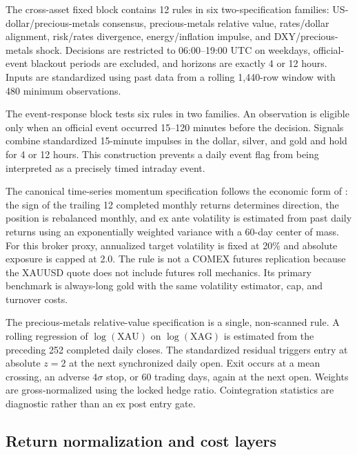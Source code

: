 The cross-asset fixed block contains 12 rules in six two-specification families: US-dollar/precious-metals consensus, precious-metals relative value, rates/dollar alignment, risk/rates divergence, energy/inflation impulse, and DXY/precious-metals shock. Decisions are restricted to 06:00--19:00 UTC on weekdays, official-event blackout periods are excluded, and horizons are exactly 4 or 12 hours. Inputs are standardized using past data from a rolling 1,440-row window with 480 minimum observations.

The event-response block tests six rules in two families. An observation is eligible only when an official event occurred 15--120 minutes before the decision. Signals combine standardized 15-minute impulses in the dollar, silver, and gold and hold for 4 or 12 hours. This construction prevents a daily event flag from being interpreted as a precisely timed intraday event.

The canonical time-series momentum specification follows the economic form of \citet{moskowitz2012}: the sign of the trailing 12 completed monthly returns determines direction, the position is rebalanced monthly, and ex ante volatility is estimated from past daily returns using an exponentially weighted variance with a 60-day center of mass. For this broker proxy, annualized target volatility is fixed at 20\% and absolute exposure is capped at 2.0. The rule is not a COMEX futures replication because the XAUUSD quote does not include futures roll mechanics. Its primary benchmark is always-long gold with the same volatility estimator, cap, and turnover costs.

The precious-metals relative-value specification is a single, non-scanned rule. A rolling regression of $\log(\mathrm{XAU})$ on $\log(\mathrm{XAG})$ is estimated from the preceding 252 completed daily closes. The standardized residual triggers entry at absolute $z=2$ at the next synchronized daily open. Exit occurs at a mean crossing, an adverse $4\sigma$ stop, or 60 trading days, again at the next open. Weights are gross-normalized using the locked hedge ratio. Cointegration statistics are diagnostic rather than an ex post entry gate.

\subsection{Return normalization and cost layers}\label{subsec:costs}

